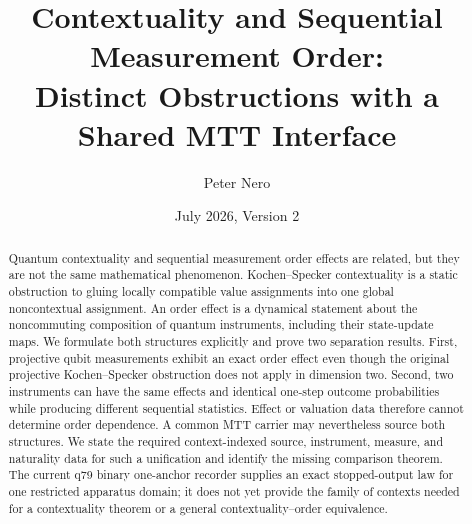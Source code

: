 \documentclass[11pt]{article}
\title{Contextuality and Sequential Measurement Order:\\
\large Distinct Obstructions with a Shared MTT Interface}
\author{Peter Nero}
\date{July 2026, Version 2}
\begin{document}
\maketitle

\begin{abstract}
Quantum contextuality and sequential measurement order effects are related,
but they are not the same mathematical phenomenon. Kochen--Specker
contextuality is a static obstruction to gluing locally compatible value
assignments into one global noncontextual assignment. An order effect is a
dynamical statement about the noncommuting composition of quantum instruments,
including their state-update maps. We formulate both structures explicitly
and prove two separation results. First, projective qubit measurements exhibit
an exact order effect even though the original projective Kochen--Specker
obstruction does not apply in dimension two. Second, two instruments can have
the same effects and identical one-step outcome probabilities while producing
different sequential statistics. Effect or valuation data therefore cannot
determine order dependence. A common MTT carrier may nevertheless source both
structures. We state the required context-indexed source, instrument, measure,
and naturality data for such a unification and identify the missing comparison
theorem. The current q79 binary one-anchor recorder supplies an exact
stopped-output law for one restricted apparatus domain; it does not yet provide
the family of contexts needed for a contextuality theorem or a general
contextuality--order equivalence.
\end{abstract}
\end{document}
